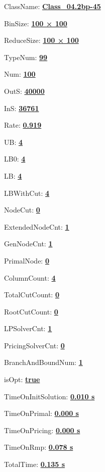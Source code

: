 \documentclass[11pt]{article}
\begin{document}
\pagestyle{empty}


ClassName: \underline{\textbf{Class_04.2bp-45}}
\par
BinSize: \underline{\textbf{100 × 100}}
\par
ReduceSize: \underline{\textbf{100 × 100}}
\par
TypeNum: \underline{\textbf{99}}
\par
Num: \underline{\textbf{100}}
\par
OutS: \underline{\textbf{40000}}
\par
InS: \underline{\textbf{36761}}
\par
Rate: \underline{\textbf{0.919}}
\par
UB: \underline{\textbf{4}}
\par
LB0: \underline{\textbf{4}}
\par
LB: \underline{\textbf{4}}
\par
LBWithCut: \underline{\textbf{4}}
\par
NodeCut: \underline{\textbf{0}}
\par
ExtendedNodeCnt: \underline{\textbf{1}}
\par
GenNodeCnt: \underline{\textbf{1}}
\par
PrimalNode: \underline{\textbf{0}}
\par
ColumnCount: \underline{\textbf{4}}
\par
TotalCutCount: \underline{\textbf{0}}
\par
RootCutCount: \underline{\textbf{0}}
\par
LPSolverCnt: \underline{\textbf{1}}
\par
PricingSolverCnt: \underline{\textbf{0}}
\par
BranchAndBoundNum: \underline{\textbf{1}}
\par
isOpt: \underline{\textbf{true}}
\par
TimeOnInitSolution: \underline{\textbf{0.010 s}}
\par
TimeOnPrimal: \underline{\textbf{0.000 s}}
\par
TimeOnPricing: \underline{\textbf{0.000 s}}
\par
TimeOnRmp: \underline{\textbf{0.078 s}}
\par
TotalTime: \underline{\textbf{0.135 s}}
\par
\newpage
\end{document}
